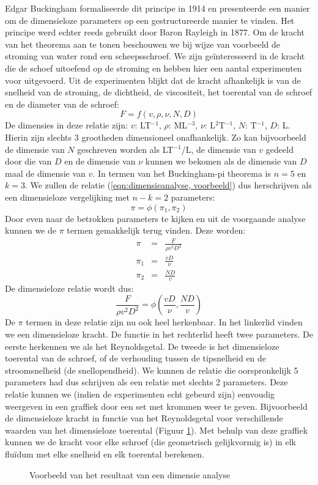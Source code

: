 Edgar Buckingham formaliseerde dit principe in 1914 en presenteerde een manier om de dimensieloze parameters op een gestructureerde manier te vinden. Het principe werd echter reeds gebruikt door Baron Rayleigh in 1877.
\npar
Om de kracht van het theorema aan te tonen beschouwen we bij wijze van voorbeeld de stroming van water rond een scheepsschroef. We zijn ge\"interesseerd in de kracht die de schoef uitoefend op de stroming en hebben hier een aantal experimenten voor uitgevoerd. Uit de experimenten blijkt dat de kracht afhankelijk is van de snelheid van de stroming, de dichtheid, de viscositeit, het toerental van de schroef en de diameter van de schroef:
\begin{equation}
	F = f(v,\rho,\nu,N,D)
	\label{eqn:dimensieanalyse, voorbeeld}
\end{equation}
De dimensies in deze relatie zijn: $v$: LT$^{-1}$, $\rho$: ML$^{-3}$, $\nu$: L$^{2}$T$^{-1}$, $N$: T$^{-1}$, $D$: L.
\npar
Hierin zijn slechts 3 grootheden dimensioneel onafhankelijk. Zo kan bijvoorbeeld de dimensie van $N$ geschreven worden als LT$^{-1}$/L, de dimensie van $v$ gedeeld door die van $D$ en de dimensie van $\nu$ kunnen we bekomen als de dimensie van $D$ maal de dimensie van $v$.  In termen van het Buckingham-pi theorema is $n=5$ en $k=3$. We zullen de relatie (\ref{eqn:dimensieanalyse, voorbeeld}) dus herschrijven als een dimensieloze vergelijking met $n-k=2$ parameters:
\begin{equation}
	\pi = \phi(\pi_1,\pi_2)
\end{equation}
Door even naar de betrokken parameters te kijken en uit de voorgaande analyse kunnen we de $\pi$ termen gemakkelijk terug vinden. Deze worden:
\begin{eqnarray}
	\pi &=& \frac{F}{\rho v^2 D^2}  \nonumber \\
	\pi_1 &=& \frac{v D}{\nu} \\
	\pi_2 &=& \frac{N D}{v} \nonumber
\end{eqnarray}
De dimensieloze relatie wordt dus:
\begin{equation}
	\frac{F}{\rho v^2 D^2} = \phi(\frac{v D}{\nu},\frac{N D}{v})
\end{equation}
De $\pi$ termen in deze relatie zijn nu ook heel herkenbaar. In het linkerlid vinden we een dimensieloze kracht. De functie in het rechterlid heeft twee parameters. De eerste herkennen we als het Reynoldsgetal. De tweede is het dimensieloze toerental van de schroef, of de verhouding tussen de tipsnelheid en de stroomsnelheid (de snellopendheid).
\npar
We kunnen de relatie die oorspronkelijk 5 parameters had dus schrijven als een relatie met slechts 2 parameters. Deze relatie kunnen we (indien de experimenten echt gebeurd zijn) eenvoudig weergeven in een graffiek door een set met krommen weer te geven. Bijvoorbeeld de dimensieloze kracht in functie van het Reynoldsgetal voor verschillende waarden van het dimensieloze toerental (Figuur \ref{fig:dimensieanalysevoorbeeld}). Met behulp van deze graffiek kunnen we de kracht voor elke schroef (die geometrisch gelijkvormig is) in elk flu\"idum met elke snelheid en elk toerental berekenen.
\begin{figure}[htb]
	\centering
	
	\caption{Voorbeeld van het resultaat van een dimensie analyse}
	\label{fig:dimensieanalysevoorbeeld}
\end{figure}